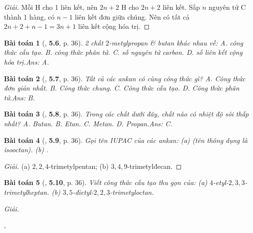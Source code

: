 \documentclass{article}
\numberwithin{equation}{section}
\newtheorem{baitoan}{Bài toán}[section]
\begin{document}
\begin{proof}[Giải]
	Mỗi H cho 1 liên kết, nên $2n + 2$ H cho $2n + 2$ liên kết. Sắp $n$ nguyên tử C thành 1 hàng, có $n - 1$ liên kết đơn giữa chúng. Nên có tất cả $2n + 2 + n - 1 = 3n + 1$ liên kết cộng hóa trị.
\end{proof}

\begin{baitoan}[\cite{SBT_Hoa_Hoc_11_co_ban}, \textbf{5.6}, p. 36]
	2 chất $2$-metylpropan \& butan khác nhau về: {\sf A.} công thức cấu tạo. {\sf B.} công thức phân tử. {\sf C.} số nguyên tử carbon. {\sf D.} số liên kết cộng hóa trị.\hfill{\sf Ans: A.}
\end{baitoan}

\begin{baitoan}[\cite{SBT_Hoa_Hoc_11_co_ban}, \textbf{5.7}, p. 36]
	Tất cả các ankan có cùng công thức gì? {\sf A.} Công thức đơn giản nhất. {\sf B.} Công thức chung. {\sf C.} Công thức cấu tạo. {\sf D.} Công thức phân tử.\hfill{\sf Ans: B.}
\end{baitoan}

\begin{baitoan}[\cite{SBT_Hoa_Hoc_11_co_ban}, \textbf{5.8}, p. 36]
	Trong các chất dưới đây, chất nào có nhiệt độ sôi thấp nhất? {\sf A.} Butan. {\sf B.} Etan. {\sf C.} Metan. {\sf D.} Propan.\hfill{\sf Ans: C.}
\end{baitoan}

\begin{baitoan}[\cite{SBT_Hoa_Hoc_11_co_ban}, \textbf{5.9}, p. 36]
	Gọi tên IUPAC của các ankan: (a) \emph{} (tên thông dụng là \emph{isooctan}). (b) \emph{}.
\end{baitoan}

\begin{proof}[Giải]
	(a) $2,2,4$-trimetylpentan; (b) $3,4,9$-trimetylđecan.
\end{proof}

\begin{baitoan}[\cite{SBT_Hoa_Hoc_11_co_ban}, \textbf{5.10}, p. 36]
	Viết công thức cấu tạo thu gọn của: (a) $4$-etyl-$2,3,3$-trimetylheptan. (b) $3,5$-đietyl-$2,2,3$-trimetyloctan.
\end{baitoan}
\noindent\textit{Giải.}
\begin{center}
	,\hspace{1cm}
\end{center}
\end{document}
